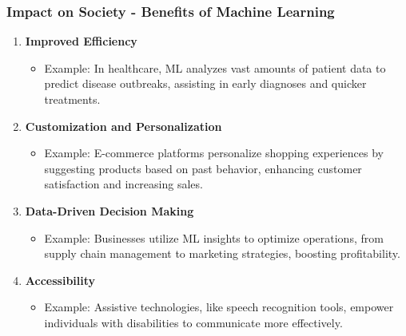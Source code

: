 \documentclass[aspectratio=169]{beamer}
\begin{document}
\begin{frame}[fragile]
    \frametitle{Impact on Society - Benefits of Machine Learning}
    \begin{enumerate}
        \item \textbf{Improved Efficiency}
            \begin{itemize}
                \item Example: In healthcare, ML analyzes vast amounts of patient data to predict disease outbreaks, assisting in early diagnoses and quicker treatments.
            \end{itemize}
        \item \textbf{Customization and Personalization}
            \begin{itemize}
                \item Example: E-commerce platforms personalize shopping experiences by suggesting products based on past behavior, enhancing customer satisfaction and increasing sales.
            \end{itemize}
        \item \textbf{Data-Driven Decision Making}
            \begin{itemize}
                \item Example: Businesses utilize ML insights to optimize operations, from supply chain management to marketing strategies, boosting profitability.
            \end{itemize}
        \item \textbf{Accessibility}
            \begin{itemize}
                \item Example: Assistive technologies, like speech recognition tools, empower individuals with disabilities to communicate more effectively.
            \end{itemize}
    \end{enumerate}
\end{frame}
\end{document}
